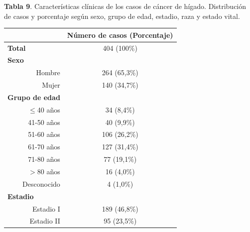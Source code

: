 \newpage
\textbf{Tabla 9}. Características clínicas de los casos de cáncer de hígado. Distribución de casos y porcentaje según sexo, grupo de edad, estadio, raza y estado vital.

\begin{table}[H]
	\centering
	\begin{tabular}{rc}
		\cline{2-2}
		\multicolumn{1}{l}{}                           & \multicolumn{1}{c}{\textbf{Número de casos (Porcentaje)}} \\ \hline
		\multicolumn{1}{l}{\textbf{Total}} & 404 (100\%)                                      \\ \hline
		\multicolumn{1}{l}{\textbf{Sexo}}              &                                                  \\
		Hombre                                         & 264 (65,3\%)                                     \\
		Mujer                                          & 140 (34,7\%)                                     \\ \hline
		\multicolumn{1}{l}{\textbf{Grupo de edad}}     &                                                  \\
		$\leq$40 años                                      & 34 (8,4\%)                                       \\
		41-50 años                                     & 40 (9,9\%)                                       \\
		51-60 años                                     & 106 (26,2\%)                                     \\
		61-70 años                                     & 127 (31,4\%)                                     \\
		71-80 años                                     & 77 (19,1\%)                                      \\
		$>$80 años                                       & 16 (4,0\%)                                         \\
		Desconocido                                    & 4 (1,0\%)                                          \\ \hline
		\multicolumn{1}{l}{\textbf{Estadio}}           &                                                  \\
		Estadio I                                      & 189 (46,8\%)                                     \\
		Estadio II                                     & 95 (23,5\%)                                      \\

\end{tabular}
\end{table}
